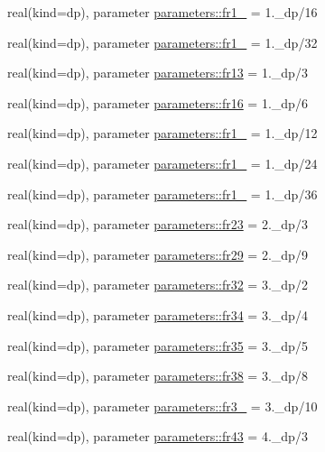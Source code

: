 \begin{DoxyCompactItemize}
real(kind=dp), parameter \mbox{\hyperlink{group__FRACTIONS_ga49bc50cd5025d08ac8f93efb9d2f2c57}{parameters\+::fr1\+\_}} = 1.\+\_\+dp/16
\item 
real(kind=dp), parameter \mbox{\hyperlink{group__FRACTIONS_ga9d703cf8cb03df7ac75c98494659c894}{parameters\+::fr1\+\_}} = 1.\+\_\+dp/32
\item 
real(kind=dp), parameter \mbox{\hyperlink{group__FRACTIONS_ga7012f1eaa8d54fce4923459913c9ea89}{parameters\+::fr13}} = 1.\+\_\+dp/3
\item 
real(kind=dp), parameter \mbox{\hyperlink{group__FRACTIONS_ga67d2b3b04777af92b519826b97ce69a4}{parameters\+::fr16}} = 1.\+\_\+dp/6
\item 
real(kind=dp), parameter \mbox{\hyperlink{group__FRACTIONS_gaa8dad9cec662853b1633da29ad89f6aa}{parameters\+::fr1\+\_}} = 1.\+\_\+dp/12
\item 
real(kind=dp), parameter \mbox{\hyperlink{group__FRACTIONS_ga6f3d13faca548dd3fb16645525651743}{parameters\+::fr1\+\_}} = 1.\+\_\+dp/24
\item 
real(kind=dp), parameter \mbox{\hyperlink{group__FRACTIONS_gaa55c45ce58d2200ffa6ff168d00e94d7}{parameters\+::fr1\+\_}} = 1.\+\_\+dp/36
\item 
real(kind=dp), parameter \mbox{\hyperlink{group__FRACTIONS_gaf550152b4a78556eab5e45a3505a690e}{parameters\+::fr23}} = 2.\+\_\+dp/3
\item 
real(kind=dp), parameter \mbox{\hyperlink{group__FRACTIONS_gaae4b443a271ca66ffd82ed02a3062073}{parameters\+::fr29}} = 2.\+\_\+dp/9
\item 
real(kind=dp), parameter \mbox{\hyperlink{group__FRACTIONS_gadb06185f00fedb4688eb75250f7365de}{parameters\+::fr32}} = 3.\+\_\+dp/2
\item 
real(kind=dp), parameter \mbox{\hyperlink{group__FRACTIONS_ga8f9972a5fa3d36c2893e702ab70c7fff}{parameters\+::fr34}} = 3.\+\_\+dp/4
\item 
real(kind=dp), parameter \mbox{\hyperlink{group__FRACTIONS_ga51fd0944911031e89f45e11247545886}{parameters\+::fr35}} = 3.\+\_\+dp/5
\item 
real(kind=dp), parameter \mbox{\hyperlink{group__FRACTIONS_ga7fcdf682bf3d4c7901343542bcee3976}{parameters\+::fr38}} = 3.\+\_\+dp/8
\item 
real(kind=dp), parameter \mbox{\hyperlink{group__FRACTIONS_gadb8dc3cfa1864abcbb3226845f3d1953}{parameters\+::fr3\+\_}} = 3.\+\_\+dp/10
\item 
real(kind=dp), parameter \mbox{\hyperlink{group__FRACTIONS_ga1705bf89adaf6e54bdf027386ecdc5a9}{parameters\+::fr43}} = 4.\+\_\+dp/3

\end{DoxyCompactItemize}

